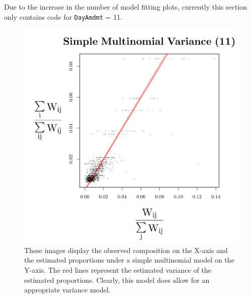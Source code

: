 \documentclass{template}
\begin{document}
Due to the increase in the number of model fitting plots, currently this section only contains code for \texttt{DayAmdmt} = 11.

\FloatBarrier

\begin{figure}[ht!]
    \centering
        \includegraphics[width=.75\textwidth]{Images/simpleMult11.pdf}
    \caption{These images display the observed composition on the X-axis and the estimated proportions under a simple multinomial model on the Y-axis. The red lines represent the estimated variance of the estimated proportions. Clearly, this model does allow for an appropriate variance model. }\label{fig:simpMult}
\end{figure}



\clearpage
\end{document}
